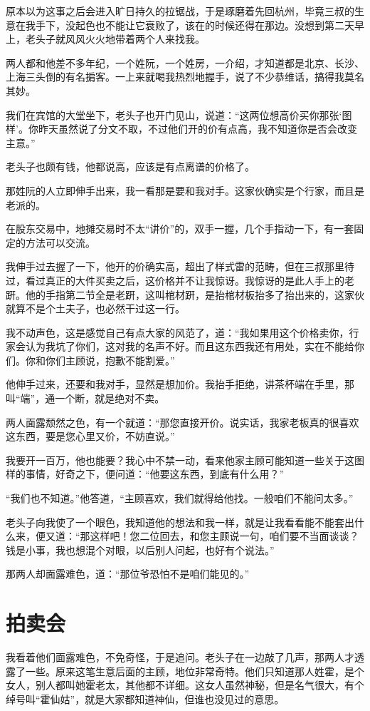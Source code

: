 原本以为这事之后会进入旷日持久的拉锯战，于是琢磨着先回杭州，毕竟三叔的生意在我手下，没起色也不能让它衰败了，该在的时候还得在那边。没想到第二天早上，老头子就风风火火地带着两个人来找我。

两人都和他差不多年纪，一个姓阮，一个姓房，一介绍，才知道都是北京、长沙、上海三头倒的有名掮客。一上来就喝我热烈地握手，说了不少恭维话，搞得我莫名其妙。

我们在宾馆的大堂坐下，老头子也开门见山，说道：“这两位想高价买你那张‘图样’。你昨天虽然说了分文不取，不过他们开的价有点高，我不知道你是否会改变主意。”

老头子也颇有钱，他都说高，应该是有点离谱的价格了。

那姓阮的人立即伸手出来，我一看那是要和我对手。这家伙确实是个行家，而且是老派的。

在股东交易中，地摊交易时不太“讲价”的，双手一握，几个手指动一下，有一套固定的方法可以交流。

我伸手过去握了一下，他开的价确实高，超出了样式雷的范畴，但在三叔那里待过，看过真正的大件买卖之后，这价格并不让我惊讶。我惊讶的是此人手上的老趼。他的手指第二节全是老趼，这叫棺材趼，是抬棺材板抬多了抬出来的，这家伙就算不是个土夫子，也必然干过这一行。

我不动声色，这是感觉自己有点大家的风范了，道：“我如果用这个价格卖你，行家会认为我坑了你们，这对我的名声不好。而且这东西我还有用处，实在不能给你们。你和你们主顾说，抱歉不能割爱。”

他伸手过来，还要和我对手，显然是想加价。我抬手拒绝，讲茶杯端在手里，那叫“端”，通一个断，就是绝对不卖。

两人面露颓然之色，有一个就道：“那您直接开价。说实话，我家老板真的很喜欢这东西，要是您心里又价，不妨直说。”

我要开一百万，他也能要？我心中不禁一动，看来他家主顾可能知道一些关于这图样的事情，好奇之下，便问道：“他要这东西，到底有什么用？”

“我们也不知道。”他答道，“主顾喜欢，我们就得给他找。一般咱们不能问太多。”

老头子向我使了一个眼色，我知道他的想法和我一样，就是让我看看能不能套出什么来，便又道：“那这样吧！您二位回去，和您主顾说一句，咱们要不当面谈谈？钱是小事，我也想混个对眼，以后别人问起，也好有个说法。”

那两人却面露难色，道：“那位爷恐怕不是咱们能见的。”

\chapter{拍卖会}

我看着他们面露难色，不免奇怪，于是追问。老头子在一边敲了几声，那两人才透露了一些。原来这笔生意后面的主顾，地位非常奇特。他们只知道那人姓霍，是个女人，别人都叫她霍老太，其他都不详细。这女人虽然神秘，但是名气很大，有个绰号叫“霍仙姑”，就是大家都知道神仙，但谁也没见过的意思。

